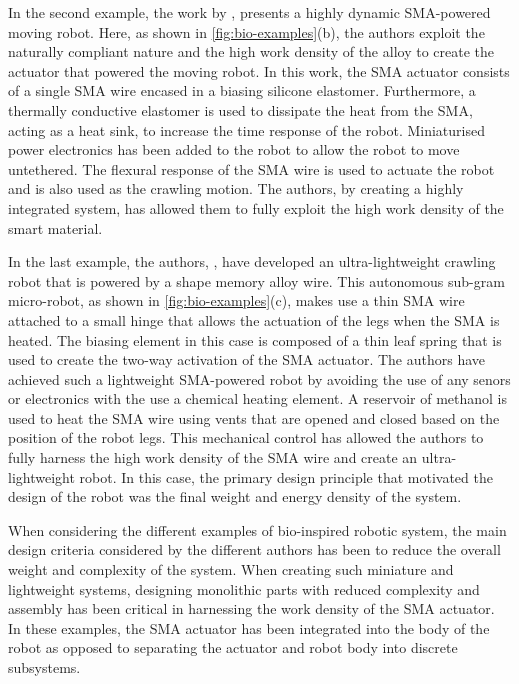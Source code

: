 In the second example, the work by \cite{huangHighlyDynamicShape2019}, presents a highly dynamic SMA-powered moving robot. Here, as shown in \cref{fig:bio-examples}(b), the authors exploit the naturally compliant nature and the high work density of the alloy to create the actuator that powered the moving robot. In this work, the SMA actuator consists of a single SMA wire encased in a biasing silicone elastomer. Furthermore, a thermally conductive elastomer is used to dissipate the heat from the SMA, acting as a heat sink, to increase the time response of the robot. Miniaturised power electronics has been added to the robot to allow the robot to move untethered. The flexural response of the SMA wire is used to actuate the robot and is also used as the crawling motion. The authors, by creating a highly integrated system, has allowed them to fully exploit the high work density of the smart material.

In the last example, the authors, \cite{yang88milligramInsectscaleAutonomous2020a}, have developed an ultra-lightweight crawling robot that is powered by a shape memory alloy wire. This autonomous sub-gram micro-robot, as shown in \cref{fig:bio-examples}(c), makes use a thin SMA wire attached to a small hinge that allows the actuation of the legs when the SMA is heated. The biasing element in this case is composed of a thin leaf spring that is used to create the two-way activation of the SMA actuator. The authors have achieved such a lightweight SMA-powered robot by avoiding the use of any senors or electronics with the use a chemical heating element. A reservoir of methanol is used to heat the SMA wire using vents that are opened and closed based on the position of the robot legs. This mechanical control has allowed the authors to fully harness the high work density of the SMA wire and create an ultra-lightweight robot. In this case, the primary design principle that motivated the design of the robot was the final weight and energy density of the system.

When considering the different examples of bio-inspired robotic system, the main design criteria considered by the different authors has been to reduce the overall weight and complexity of the system. When creating such miniature and lightweight systems, designing monolithic parts with reduced complexity and assembly has been critical in harnessing the work density of the SMA actuator. In these examples, the SMA actuator has been integrated into the body of the robot as opposed to separating the actuator and robot body into discrete subsystems.


